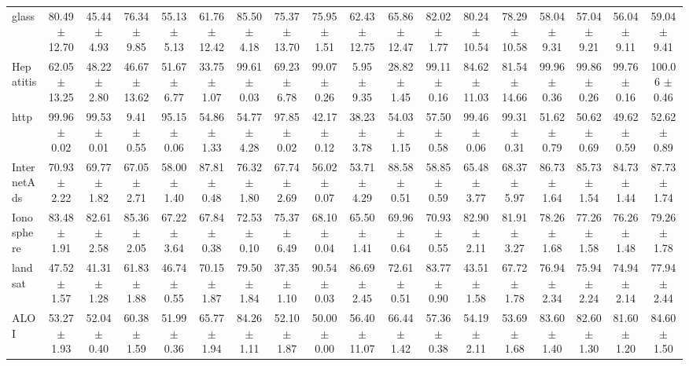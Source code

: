 \begin{table}[ht]
\begin{adjustbox}{max width=\textwidth}
\begin{tabular}{lccccccccccccccccc}
           glass & 80.49 $\pm$ 12.70 &  45.44 $\pm$ 4.93 &  76.34 $\pm$ 9.85 &  55.13 $\pm$ 5.13 & 61.76 $\pm$ 12.42 &  85.50 $\pm$ 4.18 & 75.37 $\pm$ 13.70 & 75.95 $\pm$ 1.51 & 62.43 $\pm$ 12.75 & 65.86 $\pm$ 12.47 &  82.02 $\pm$ 1.77 & 80.24 $\pm$ 10.54 & 78.29 $\pm$ 10.58 &  58.04 $\pm$ 9.31 &  57.04 $\pm$ 9.21 &  56.04 $\pm$ 9.11 &  59.04 $\pm$ 9.41 \\
       Hepatitis & 62.05 $\pm$ 13.25 &  48.22 $\pm$ 2.80 & 46.67 $\pm$ 13.62 &  51.67 $\pm$ 6.77 &  33.75 $\pm$ 1.07 &  99.61 $\pm$ 0.03 &  69.23 $\pm$ 6.78 & 99.07 $\pm$ 0.26 &   5.95 $\pm$ 9.35 &  28.82 $\pm$ 1.45 &  99.11 $\pm$ 0.16 & 84.62 $\pm$ 11.03 & 81.54 $\pm$ 14.66 &  99.96 $\pm$ 0.36 &  99.86 $\pm$ 0.26 &  99.76 $\pm$ 0.16 & 100.06 $\pm$ 0.46 \\
            http &  99.96 $\pm$ 0.02 &  99.53 $\pm$ 0.01 &   9.41 $\pm$ 0.55 &  95.15 $\pm$ 0.06 &  54.86 $\pm$ 1.33 &  54.77 $\pm$ 4.28 &  97.85 $\pm$ 0.02 & 42.17 $\pm$ 0.12 &  38.23 $\pm$ 3.78 &  54.03 $\pm$ 1.15 &  57.50 $\pm$ 0.58 &  99.46 $\pm$ 0.06 &  99.31 $\pm$ 0.31 &  51.62 $\pm$ 0.79 &  50.62 $\pm$ 0.69 &  49.62 $\pm$ 0.59 &  52.62 $\pm$ 0.89 \\
     InternetAds &  70.93 $\pm$ 2.22 &  69.77 $\pm$ 1.82 &  67.05 $\pm$ 2.71 &  58.00 $\pm$ 1.40 &  87.81 $\pm$ 0.48 &  76.32 $\pm$ 1.80 &  67.74 $\pm$ 2.69 & 56.02 $\pm$ 0.07 &  53.71 $\pm$ 4.29 &  88.58 $\pm$ 0.51 &  58.85 $\pm$ 0.59 &  65.48 $\pm$ 3.77 &  68.37 $\pm$ 5.97 &  86.73 $\pm$ 1.64 &  85.73 $\pm$ 1.54 &  84.73 $\pm$ 1.44 &  87.73 $\pm$ 1.74 \\
      Ionosphere &  83.48 $\pm$ 1.91 &  82.61 $\pm$ 2.58 &  85.36 $\pm$ 2.05 &  67.22 $\pm$ 3.64 &  67.84 $\pm$ 0.38 &  72.53 $\pm$ 0.10 &  75.37 $\pm$ 6.49 & 68.10 $\pm$ 0.04 &  65.50 $\pm$ 1.41 &  69.96 $\pm$ 0.64 &  70.93 $\pm$ 0.55 &  82.90 $\pm$ 2.11 &  81.91 $\pm$ 3.27 &  78.26 $\pm$ 1.68 &  77.26 $\pm$ 1.58 &  76.26 $\pm$ 1.48 &  79.26 $\pm$ 1.78 \\
         landsat &  47.52 $\pm$ 1.57 &  41.31 $\pm$ 1.28 &  61.83 $\pm$ 1.88 &  46.74 $\pm$ 0.55 &  70.15 $\pm$ 1.87 &  79.50 $\pm$ 1.84 &  37.35 $\pm$ 1.10 & 90.54 $\pm$ 0.03 &  86.69 $\pm$ 2.45 &  72.61 $\pm$ 0.51 &  83.77 $\pm$ 0.90 &  43.51 $\pm$ 1.58 &  67.72 $\pm$ 1.78 &  76.94 $\pm$ 2.34 &  75.94 $\pm$ 2.24 &  74.94 $\pm$ 2.14 &  77.94 $\pm$ 2.44 \\
            ALOI &  53.27 $\pm$ 1.93 &  52.04 $\pm$ 0.40 &  60.38 $\pm$ 1.59 &  51.99 $\pm$ 0.36 &  65.77 $\pm$ 1.94 &  84.26 $\pm$ 1.11 &  52.10 $\pm$ 1.87 & 50.00 $\pm$ 0.00 & 56.40 $\pm$ 11.07 &  66.44 $\pm$ 1.42 &  57.36 $\pm$ 0.38 &  54.19 $\pm$ 2.11 &  53.69 $\pm$ 1.68 &  83.60 $\pm$ 1.40 &  82.60 $\pm$ 1.30 &  81.60 $\pm$ 1.20 &  84.60 $\pm$ 1.50 \\

\end{tabular}
\end{adjustbox}
\end{table}
